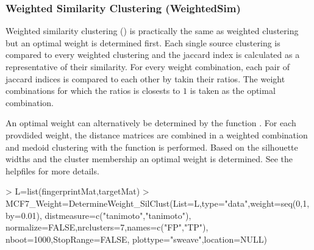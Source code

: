 \documentclass[a4paper]{article}
\begin{document}
\subsubsection{Weighted Similarity Clustering (WeightedSim)}
Weighted similarity clustering (\cite{Perualila-Tan2015}) is practically the
same as weighted clustering but an optimal weight is determined first. Each
single source clustering is compared to every weighted clustering and the
jaccard index is calculated as a representative of their similarity. For every
weight combination, each pair of jaccard indices is compared to each other by
takin their ratios. The weight combinations for which the ratios is closests to
$1$ is taken as the optimal combination.
\begin{Schunk}
\end{Schunk}
\noindent An optimal weight can alternatively be determined by the function
. For each provdided weight, the distance
matrices are combined in a weighted combination and medoid clustering with the
 function is performed. Based on the silhouette widths and the cluster
membership an optimal weight is determined. See the helpfiles for more details.
\begin{Schunk}
\begin{Sinput}
> L=list(fingerprintMat,targetMat)
> MCF7_Weight=DetermineWeight_SilClust(List=L,type="data",weight=seq(0,1,by=0.01),
                                      distmeasure=c("tanimoto","tanimoto"),
                                      normalize=FALSE,nrclusters=7,names=c("FP","TP"),
                                      nboot=1000,StopRange=FALSE,
                                      plottype="sweave",location=NULL)
\end{Sinput}
\end{Schunk}
\end{document}

